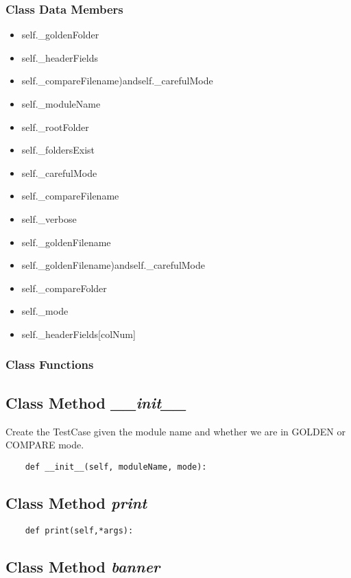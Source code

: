 \documentclass[twoside,11pt]{book}
\begin{document}
\subsubsection{Class Data Members}
\begin{itemize}
\item{self.\_goldenFolder}
\item{self.\_headerFields}
\item{self.\_compareFilename)andself.\_carefulMode}
\item{self.\_moduleName}
\item{self.\_rootFolder}
\item{self.\_foldersExist}
\item{self.\_carefulMode}
\item{self.\_compareFilename}
\item{self.\_verbose}
\item{self.\_goldenFilename}
\item{self.\_goldenFilename)andself.\_carefulMode}
\item{self.\_compareFolder}
\item{self.\_mode}
\item{self.\_headerFields[colNum]}
\end{itemize}

\subsubsection{Class Functions}

\subsection{Class Method {\it \_\_init\_\_}}
Create the TestCase given the module name and whether we are in GOLDEN or COMPARE mode. 

\begin{lstlisting}
    def __init__(self, moduleName, mode):
\end{lstlisting}

\subsection{Class Method {\it print}}


\begin{lstlisting}
    def print(self,*args):
\end{lstlisting}

\subsection{Class Method {\it banner}}
\end{document}
